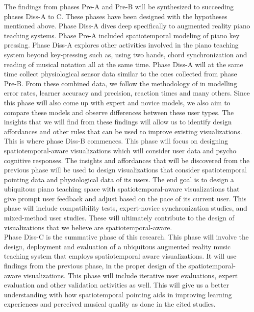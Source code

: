 \documentclass[manuscript,screen]{acmart}
\begin{document}
The findings from phases Pre-A and Pre-B will be synthesized to succeeding phases Diss-A to C. These phases have been designed with the hypotheses mentioned above. Phase Diss-A dives deep specifically to augmented reality piano teaching systems. Phase Pre-A included spatiotemporal modeling of piano key pressing. Phase Diss-A explores other activities involved in the piano teaching system beyond key-pressing such as, using two hands, chord synchronization and reading of musical notation all at the same time. Phase Diss-A will at the same time collect physiological sensor data similar to the ones collected from phase Pre-B. From these combined data, we follow the methodology of  in modelling error rates, learner accuracy and precision, reaction times and many others. Since this phase will also come up with expert and novice models, we also aim to compare these models and observe differences between these user types. The insights that we will find from these findings will allow us to identify design affordances and other rules that can be used to improve existing visualizations.\\

This is where phase Diss-B commences. This phase will focus on designing spatiotemporal-aware visualizations which will consider user data and psycho cognitive responses. The insights and affordances that will be discovered from the previous phase will be used to design visualizations that consider spatiotemporal pointing data and physiological data of its users. The end goal is to design a ubiquitous piano teaching space with spatiotemporal-aware visualizations that give prompt user feedback and adjust based on the pace of its current user. This phase will include compatibility tests, expert-novice synchronization studies, and mixed-method user studies. These will ultimately contribute to the design of visualizations that we believe are spatiotemporal-aware.  \\

Phase Diss-C is the summative phase of this research. This phase will involve the design, deployment and evaluation of a ubiquitous augmented reality music teaching system that employs spatiotemporal aware visualizations. It will use findings from the previous phase, in the proper design of the spatiotemporal-aware visualizations. This phase will include iterative user evaluations, expert evaluation and other validation activities as well. This will give us a better understanding with how spatiotemporal pointing aids in improving learning experiences and perceived musical quality as done in the cited studies. \\
\end{document}
